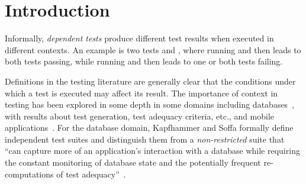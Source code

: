 \section{Introduction}


Informally, \emph{dependent tests} produce different test results when
executed in different contexts. %
An example is two tests 
and , where running  and then  leads
to both tests passing, while running  and then
 leads to one or both tests failing.




Definitions in the testing literature are generally clear that the
conditions under which a test is executed may affect its result.  The
importance of context in testing has been explored in some depth in
some domains including databases~\cite{Gray:1994:QGB:191843.191886,Chays:2000:FTD:347324.348954,
kapfhammeretal:FSE:2003}, with results about test
generation, test adequacy criteria, etc., and mobile
applications~\cite{Wang:2007:AGC}.
For the database domain, Kapfhammer and Soffa formally
define independent test suites and distinguish them from a
\emph{non-restricted} suite that ``can capture more of an application's
interaction with a database while requiring the constant monitoring of
database state and the potentially frequent re-computations of test
adequacy''~\cite[p.~101]{kapfhammeretal:FSE:2003}.


